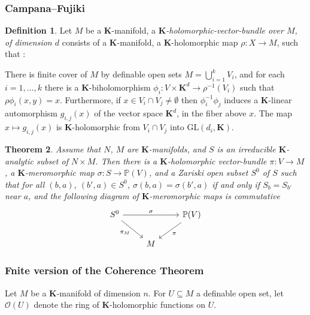 \documentclass{amsart}
\newtheorem{theorem}{Theorem}[subsection]
\theoremstyle{definition}
\newtheorem{definition}[theorem]{Definition}
\numberwithin{equation}{section}
\begin{document}
\subsubsection{Campana--Fujiki}
\begin{definition}
  Let $M$ be a $\mathbf{K}$-manifold,
  a \emph{$\mathbf{K}$-holomorphic-vector-bundle over $M$,
  of dimension $d$} consists of a $\mathbf{K}$-manifold,
  a $\mathbf{K}$-holomorphic map $\rho: X \to M$,
  such that :

  There is finite cover of $M$ by definable open sets $M = \bigcup_{i=1}^k V_i$,
  and for each $i = 1,\dots,k$ there is a $\mathbf{K}$-biholomorphism
  $\phi_i: V \times \mathbf{K}^d \to \rho^{-1}(V_i)$ such that $\rho\phi_i(x,y) = x$.
  Furthermore, if $x \in V_i\cap V_j \neq\emptyset$ then $\phi_i^{-1}\phi_j$ induces
  a $\mathbf{K}$-linear automorphism $g_{i,j}(x)$ of the vector space $\mathbf{K}^d$,
  in the fiber above $x$.
  The map $x\mapsto g_{i,j}(x)$ is $\mathbf{K}$-holomorphic from $V_i\cap V_j$ into $\mathrm{GL}(d_i,\mathbf{K})$.
\end{definition}

\begin{tcolorbox}
  \begin{theorem}
    Assume that $N$, $M$ are $\mathbf{K}$-manifolds,
    and $S$ is an irreducible $\mathbf{K}$-analytic subset of $N \times M$.
    Then there is a $\mathbf{K}$-holomorphic vector-bundle
    $\pi: V \to M$, a $\mathbf{K}$-meromorphic map $\sigma: S \to \mathbb{P}(V)$,
    and a Zariski open subset $S^0$ of $S$ such that for all
    $(b,a)$, $(b',a)\in S^0$, $\sigma(b,a) = \sigma(b',a)$ if and only if
    $S_b = S_{b'}$ near $a$, and the following diagram of $\mathbf{K}$-meromorphic
    maps is commutative
    \[
      \begin{tikzcd}
        S^0 \ar[rr,"\sigma"]\ar[dr,"\pi_M"'] & & \mathbb{P}(V)\ar[dl,"\pi"] \\
        & M &
      \end{tikzcd}
      \]
  \end{theorem}
\end{tcolorbox}

\subsubsection{Fnite version of the Coherence Theorem}

Let $M$ be a $\mathbf{K}$-manifold of dimension $n$.
For $U \subseteq M$ a definable open set,
let $\mathcal{O}(U)$ denote the ring of $\mathbf{K}$-holomorphic functions on $U$.
\end{document}

